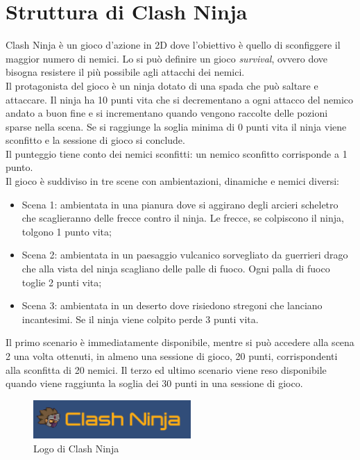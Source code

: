 \documentclass[12pt,a4paper,openright,twoside]{book}
\begin{document}
	\section[Struttura]{Struttura di Clash Ninja}
	Clash Ninja è un gioco d'azione in 2D dove l'obiettivo è quello di sconfiggere il maggior numero di nemici. Lo si può definire un gioco \textit{survival}, ovvero dove bisogna resistere il più possibile agli attacchi dei nemici.\\
	Il protagonista del gioco è un ninja dotato di una spada che può saltare e attaccare. Il ninja ha 10 punti vita che si decrementano a ogni attacco del nemico andato a buon fine e si incrementano quando vengono raccolte delle pozioni sparse nella scena. Se si raggiunge la soglia minima di 0 punti vita il ninja viene sconfitto e la sessione di gioco si conclude.\\
	Il punteggio tiene conto dei nemici sconfitti: un nemico sconfitto corrisponde a 1 punto.\\
    Il gioco è suddiviso in tre scene con ambientazioni, dinamiche e nemici diversi:
    \begin{itemize}
    	\item Scena 1: ambientata in una pianura dove si aggirano degli arcieri scheletro che scaglieranno delle frecce contro il ninja. Le frecce, se colpiscono il ninja, tolgono 1 punto vita;
    	\item Scena 2: ambientata in un paesaggio vulcanico sorvegliato da guerrieri drago che alla vista del ninja scagliano delle palle di fuoco. Ogni palla di fuoco toglie 2 punti vita;
    	\item Scena 3: ambientata in un deserto dove risiedono stregoni che lanciano incantesimi. Se il ninja viene colpito perde 3 punti vita.
    \end{itemize}
		Il primo scenario è immediatamente disponibile, mentre si può accedere alla scena 2 una volta ottenuti, in almeno una sessione di gioco, 20 punti, corrispondenti alla sconfitta di 20 nemici. Il terzo ed ultimo scenario viene reso disponibile quando viene raggiunta la soglia dei 30 punti in una sessione di gioco.
		\begin{figure}[h]
		\centering   	
		\includegraphics[width=60mm]{logoclashninja.png}
		\caption{Logo di Clash Ninja}
		\label{fig:logclash}
	\end{figure}	
\end{document}
